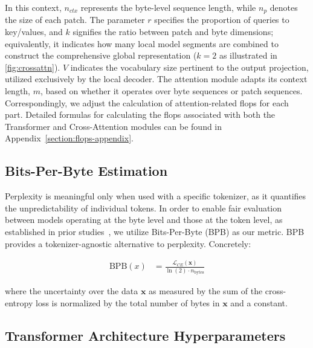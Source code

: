 In this context, $n_{ctx}$ represents the byte-level sequence length, while $n_p$ denotes the size of each patch. The parameter $r$ specifies the proportion of queries to key/values, and $k$ signifies the ratio between patch and byte dimensions; equivalently, it indicates how many local model segments are combined to construct the comprehensive global representation ($k=2$ as illustrated in \autoref{fig:crossattn}). $V$ indicates the vocabulary size pertinent to the output projection, utilized exclusively by the local decoder. The attention module adapts its context length, $m$, based on whether it operates over byte sequences or patch sequences. Correspondingly, we adjust the calculation of attention-related flops for each part. Detailed formulas for calculating the flops associated with both the Transformer and Cross-Attention modules can be found in Appendix~\ref{section:flops-appendix}.

\subsection{Bits-Per-Byte Estimation} Perplexity is meaningful only when used with a specific tokenizer, as it quantifies the unpredictability of individual tokens. In order to enable fair evaluation between models operating at the byte level and those at the token level, as established in prior studies~\citep{xue2022byt5, yu2023megabyte, wang2024mambabyte}, we utilize Bits-Per-Byte (BPB) as our metric. BPB provides a tokenizer-agnostic alternative to perplexity. Concretely:

\begin{align}
    \text{BPB}(x)&= \frac{\mathcal{L}_{CE}(\pmb{x})}{\ln(2)\cdot n_{\text{bytes}}}
\end{align}

where the uncertainty over the data $\pmb{x}$ as measured by the sum of the cross-entropy loss is normalized by the total number of bytes in $\pmb{x}$ and a constant. 

\subsection{Transformer Architecture Hyperparameters} 

